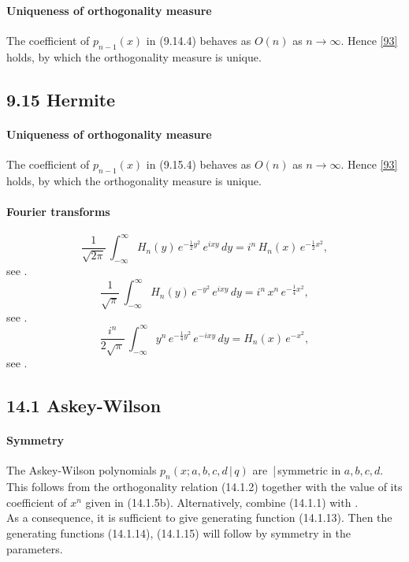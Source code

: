 \documentclass[twoside,11pt]{article}
\newcommand\sa{\smallskipamount}
\newcommand\sLP{\\[\sa]}
\newcommand\half{\frac12}
\newcommand\iy\infty
\begin{document}
\paragraph{Uniqueness of orthogonality measure}
The coefficient of $p_{n-1}(x)$ in (9.14.4) behaves as $O(n)$ as $n\to\iy$.
Hence \eqref{93} holds, by which the orthogonality measure is unique.
%
\subsection*{9.15 Hermite}
\label{sec9.15}
%
\paragraph{Uniqueness of orthogonality measure}
The coefficient of $p_{n-1}(x)$ in (9.15.4) behaves as $O(n)$ as $n\to\iy$.
Hence \eqref{93} holds, by which the orthogonality measure is unique.
%
\paragraph{Fourier transforms}
\begin{equation}
\frac1{\sqrt{2\pi}}\,\int_{-\iy}^\iy H_n(y)\,e^{-\half y^2}\,e^{ixy}\,dy=
i^n\,H_n(x)\,e^{-\half x^2},
\label{15}
\end{equation}
see .
\begin{equation}
\frac1{\sqrt\pi}\,\int_{-\iy}^\iy H_n(y)\,e^{-y^2}\,e^{ixy}\,dy=
i^n\,x^n\,e^{-\frac14 x^2},
\label{16}
\end{equation}
see .
\begin{equation}
\frac{i^n}{2\sqrt\pi}\,\int_{-\iy}^\iy y^n\,e^{-\frac14 y^2}\,e^{-ixy}\,dy=
H_n(x)\,e^{-x^2},
\label{17}
\end{equation}
see .
%
\subsection*{14.1 Askey-Wilson}
\label{sec14.1}
%
\paragraph{Symmetry}
The Askey-Wilson polynomials $p_n(x;a,b,c,d\,|\,q)$ are \,|\,symmetric
in $a,b,c,d$.
\sLP
This follows from the orthogonality relation (14.1.2)
together with the value of its coefficient of $x^n$ given in (14.1.5b).
Alternatively, combine (14.1.1) with .\\
As a consequence, it is sufficient to give generating function (14.1.13). Then the generating
functions (14.1.14), (14.1.15) will follow by symmetry in the parameters.
%
\end{document}
